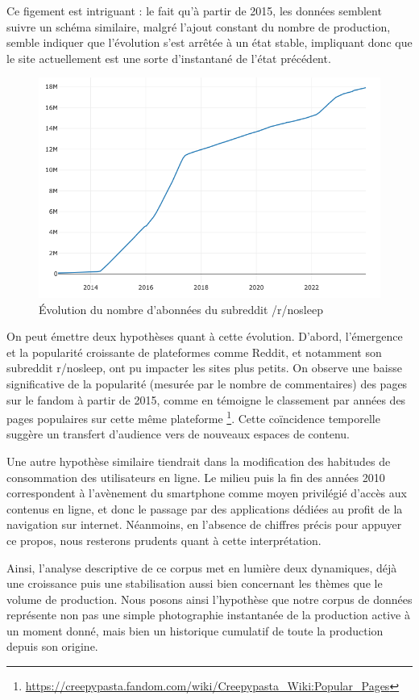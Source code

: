 \documentclass[12pt,a4paper,oneside,titlepage]{book} %
\begin{document}
Ce figement est intriguant : le fait qu'à partir de 2015, les données semblent suivre un schéma similaire, malgré l'ajout constant du nombre de production, semble indiquer que l'évolution s'est arrêtée à un état stable, impliquant donc que le site actuellement est une sorte d'instantané de l'état précédent. 
\begin{figure}
    \centering
    \includegraphics[width=0.5\linewidth]{illustration/subscriber_reddit.png}
    \caption{Évolution du nombre d'abonnées du subreddit /r/nosleep}
    \label{fig:sub_reddit}
\end{figure}

On peut émettre deux hypothèses quant à cette évolution. 
D'abord, l'émergence et la popularité croissante de plateformes comme Reddit, et notamment son subreddit r/nosleep, ont pu impacter les sites plus petits. On observe une baisse significative de la popularité (mesurée par le nombre de commentaires) des pages sur le fandom à partir de 2015, comme en témoigne le classement par années des pages populaires sur cette même plateforme \footnote{\url{https://creepypasta.fandom.com/wiki/Creepypasta_Wiki:Popular_Pages}}. Cette coïncidence temporelle suggère un transfert d'audience vers de nouveaux espaces de contenu.

Une autre hypothèse similaire tiendrait dans la modification des habitudes de consommation des utilisateurs en ligne. Le milieu puis la fin des années 2010 correspondent à l'avènement du smartphone comme moyen privilégié d'accès aux contenus en ligne, et donc le passage par des applications dédiées au profit de la navigation sur internet. Néanmoins, en l'absence de chiffres précis pour appuyer ce propos, nous resterons prudents quant à cette interprétation.

Ainsi, l'analyse descriptive de ce corpus met en lumière deux dynamiques, déjà une croissance puis une stabilisation aussi bien concernant les thèmes que le volume de production. Nous posons ainsi l'hypothèse que notre corpus de données représente non pas une simple \og photographie instantanée\fg{} de la production active à un moment donné, mais bien un historique cumulatif de toute la production depuis son origine.
\end{document}
